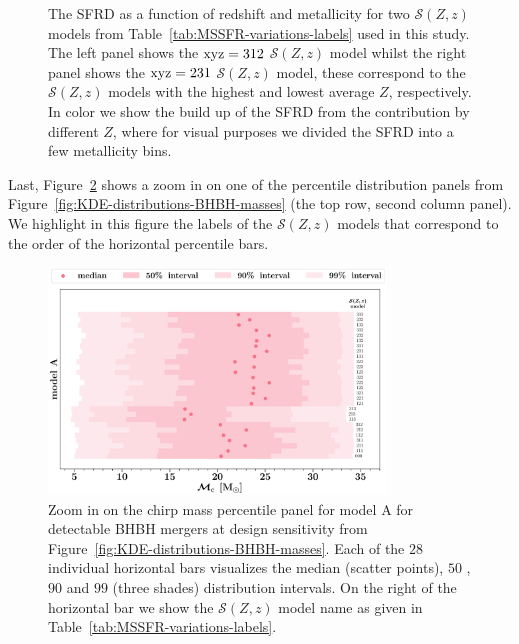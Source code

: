 \documentclass[fleqn,usenatbib]{mnras}
\newcommand{\Zi}{\ensuremath{Z}\xspace}
\newcommand{\SFRD}{\ensuremath{\mathcal{S}(Z,z)}\xspace}
\newcommand{\NmodelsMSSFR}{\ensuremath{28}\xspace}
\begin{document}
\begin{figure}
      \qquad
  \caption{The \ac{SFRD} as a function of redshift and metallicity for two \SFRD models from Table~\ref{tab:MSSFR-variations-labels} used in this study. The left panel shows the  $\rm{xyz}=312$    \SFRD model whilst the right panel shows the  $\rm{xyz}=231$ \SFRD model, these correspond to the \SFRD models with the highest and lowest average \Zi, respectively. In color we show the build up of the \ac{SFRD} from the contribution by different \Zi, where  for visual purposes we divided the \ac{SFRD} into a few  metallicity bins.  \href{https://github.com/FloorBroekgaarden/Double-Compact-Object-Mergers/blob/main/plottingCode/Fig_A2/SFRDandZi_xyz312_.pdf}{\faFileImage} \href{https://github.com/FloorBroekgaarden/Double-Compact-Object-Mergers/blob/main/plottingCode/Fig_A2/SFRDandZi_xyz231_.pdf}{\faFileImage}  \href{https://github.com/FloorBroekgaarden/Double-Compact-Object-Mergers/blob/main/plottingCode/Fig_A2/make_Fig_A2.ipynb}{\faBook}}
  \label{fig:2panels_examples_SFRD-Z}
\end{figure}
%


Last, Figure~\ref{fig:chirp-mass-percentile-zoom-in} shows a zoom in on one of the percentile distribution panels from Figure~\ref{fig:KDE-distributions-BHBH-masses} (the top row, second column panel). We highlight in this figure the labels of the \SFRD models that correspond to the order of the horizontal percentile bars. 

\begin{figure}
    \centering
\includegraphics[width=0.8\textwidth]{figures/PercentilePlot_ZOOM.pdf}
\caption{ Zoom in on the chirp mass percentile panel for model A for detectable BHBH mergers at design sensitivity from Figure~\ref{fig:KDE-distributions-BHBH-masses}.  Each of the \NmodelsMSSFR  individual horizontal bars  visualizes the median (scatter points), $50$ , $90$  and $99$  (three shades) distribution intervals. On the right of the horizontal bar we show the \SFRD model name as given in Table~\ref{tab:MSSFR-variations-labels}.  \href{https://github.com/FloorBroekgaarden/Double-Compact-Object-Mergers/blob/main/plottingCode/Fig_4_and_Fig_5_and_Fig_6/PercentilePlot_ZOOM.pdf}{\faFileImage}  \href{https://github.com/FloorBroekgaarden/Double-Compact-Object-Mergers/blob/main/plottingCode/Fig_4_and_Fig_5_and_Fig_6/make_figure_A3.ipynb}{\faBook}  } 
%
    \label{fig:chirp-mass-percentile-zoom-in}
\end{figure}
%





\bsp	%
\label{lastpage}
\end{document}
